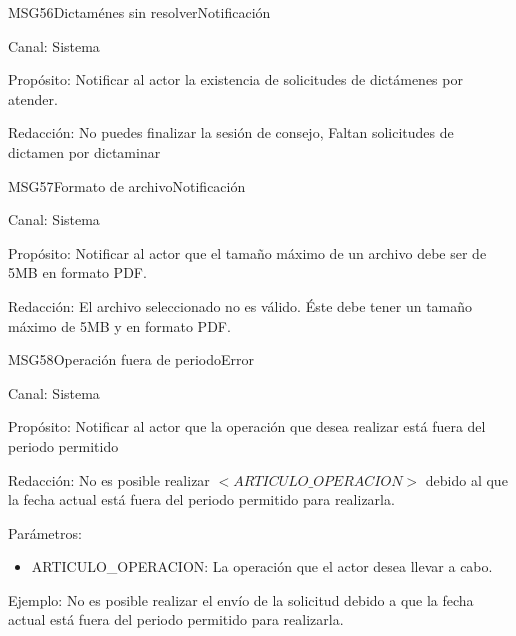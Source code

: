 \begin{mensaje}{MSG56}{Dictaménes sin resolver}{Notificación}
	\item[Canal:] Sistema
	\item[Propósito:] Notificar al actor la existencia de solicitudes de dictámenes por atender.
	\item[Redacción:] No puedes finalizar la sesión de consejo, Faltan solicitudes de dictamen por dictaminar
	
\end{mensaje}

\begin{mensaje}{MSG57}{Formato de archivo}{Notificación}
	\item[Canal:] Sistema
	\item[Propósito:] Notificar al actor que el tamaño máximo de un archivo debe ser de 5MB en formato PDF.
	\item[Redacción:] El archivo seleccionado no es válido. Éste debe tener un tamaño máximo de 5MB y en formato PDF.
	
\end{mensaje}

\begin{mensaje}{MSG58}{Operación fuera de periodo}{Error}
	\item[Canal:] Sistema
	\item[Propósito:] Notificar al actor que la operación que desea realizar está fuera del periodo permitido
	\item[Redacción:] No es posible realizar $<ARTICULO\_OPERACION>$ debido al que la fecha actual está fuera del periodo permitido para realizarla.
	\item[Parámetros:] 
	\begin{itemize}
		\item ARTICULO\_OPERACION: La operación que el actor desea llevar a cabo.
	\end{itemize}
	\item[Ejemplo:] No es posible realizar el envío de la solicitud debido a que la fecha actual está fuera del periodo permitido para realizarla.
\end{mensaje}


